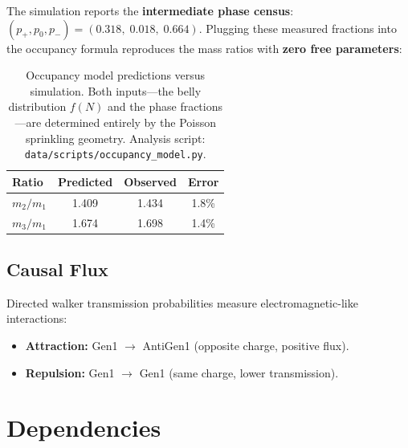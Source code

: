 \documentclass[11pt, a4paper, openany]{book}
\newcommand{\code}[1]{\texttt{#1}}
\begin{document}
The simulation reports the \textbf{intermediate phase census}:
$(p_+, p_0, p_-) = (0.318,\; 0.018,\; 0.664)$.  Plugging these
measured fractions into the occupancy formula reproduces the mass ratios
with \textbf{zero free parameters}:

\begin{table}[H]
\centering
\begin{tabular}{@{} l c c c @{}}
\toprule
\textbf{Ratio} & \textbf{Predicted} & \textbf{Observed} & \textbf{Error} \\
\midrule
$m_2/m_1$ & 1.409 & 1.434 & 1.8\% \\
$m_3/m_1$ & 1.674 & 1.698 & 1.4\% \\
\bottomrule
\end{tabular}
\caption{Occupancy model predictions versus simulation.  Both inputs---the
belly distribution $f(N)$ and the phase fractions---are determined
entirely by the Poisson sprinkling geometry.  Analysis script:
\code{data/scripts/occupancy\_model.py}.}
\end{table}

\section{Causal Flux}

Directed walker transmission probabilities measure electromagnetic-like
interactions:
\begin{itemize}
  \item \textbf{Attraction:} Gen1 $\to$ AntiGen1 (opposite charge, positive
        flux).
  \item \textbf{Repulsion:} Gen1 $\to$ Gen1 (same charge, lower transmission).
\end{itemize}


\chapter{Dependencies}
\end{document}
